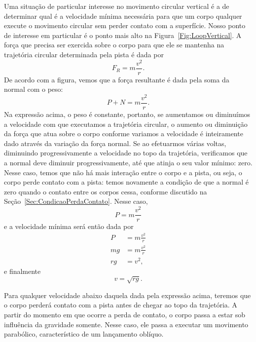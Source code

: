 Uma situação de particular interesse no movimento circular vertical é a de determinar qual é a velocidade mínima necessária para que um corpo qualquer execute o movimento circular sem perder contato com a superfície. Nosso ponto de interesse em particular é o ponto mais alto na Figura~\ref{Fig:LoopVertical}. A força que precisa ser exercida sobre o corpo para que ele se mantenha na trajetória circular determinada pela pista é dada por
\begin{equation}
    F_R = m \frac{v^2}{r}.
\end{equation}
%
De acordo com a figura, vemos que a força resultante é dada pela soma da normal com o peso:
\begin{equation}
    P + N = m\frac{v^2}{r}.
\end{equation}
%
Na expressão acima, o peso é constante, portanto, se aumentamos ou diminuímos a velocidade com que executamos a trajetória circular, o aumento ou diminuição da força que atua sobre o corpo conforme variamos a velocidade é inteiramente dado através da variação da força normal. Se ao efetuarmos várias voltas, diminuindo progressivamente a velocidade no topo da trajetória, verificamos que a normal deve diminuir progressivamente, até que atinja o seu valor mínimo: zero. Nesse caso, temos que não há mais interação entre o corpo e a pista, ou seja, o corpo perde contato com a pista: temos novamente a condição de que a normal é zero quando o contato entre os corpos cessa, conforme discutido na Seção~\ref{Sec:CondicaoPerdaContato}. Nesse caso,
\begin{equation}
    P = m \frac{v^2}{r}
\end{equation}
%
e a velocidade mínima será então dada por
\begin{align}
    P &= m\frac{v^2}{r} \\
    mg &= m\frac{v^2}{r} \\
    rg &= v^2,
\end{align}
%
e finalmente
\begin{equation}
    v = \sqrt{rg}.
\end{equation}

Para qualquer velocidade abaixo daquela dada pela expressão acima, teremos que o corpo perderá contato com a pista antes de chegar ao topo da trajetória. A partir do momento em que ocorre a perda de contato, o corpo passa a estar sob influência da gravidade somente. Nesse caso, ele passa a executar um movimento parabólico, característico de um lançamento oblíquo.

